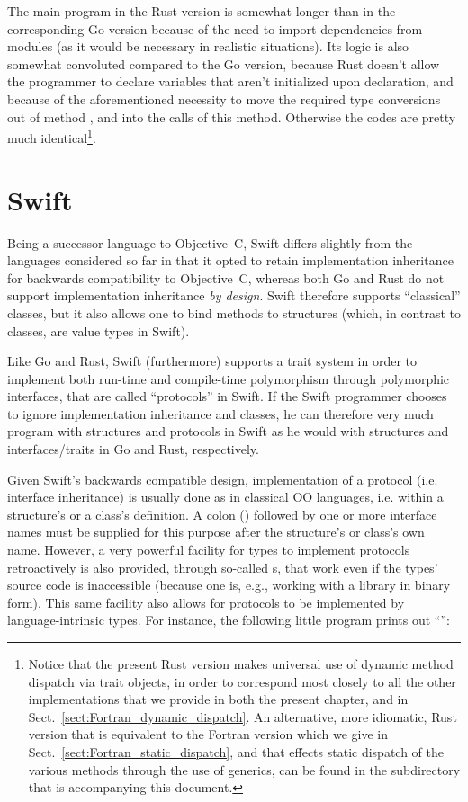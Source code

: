 \documentclass[11pt,oneside]{report}
\newcommand{\code}[1]{{\selectfont\ttfamily{#1}}}
\begin{document}
The main program in the Rust version is somewhat longer than in the
corresponding Go version because of the need to import dependencies
from modules (as it would be necessary in realistic situations). Its
logic is also somewhat convoluted compared to the Go version, because
Rust doesn't allow the programmer to declare variables that aren't
initialized upon declaration, and because of the aforementioned
necessity to move the required type conversions out of method
\code{average}, and into the calls of this method. Otherwise the codes
are pretty much identical\footnote{Notice that the present Rust
version makes universal use of dynamic method dispatch via trait
objects, in order to correspond most closely to all the other
implementations that we provide in both the present chapter, and in
Sect.~\ref{sect:Fortran_dynamic_dispatch}. An alternative, more
idiomatic, Rust version that is equivalent to the Fortran version
which we give in Sect.~\ref{sect:Fortran_static_dispatch}, and that
effects static dispatch of the various \code{sum} methods through the
use of generics, can be found in the \code{Code} subdirectory that is
accompanying this document.}.


\section{Swift}

Being a successor language to Objective~C, Swift differs slightly from
the languages considered so far in that it opted to retain
implementation inheritance for backwards compatibility to Objective~C,
whereas both Go and Rust do not support implementation inheritance
\emph{by design}. Swift therefore supports ``classical'' classes, but
it also allows one to bind methods to structures (which, in contrast
to classes, are value types in Swift).

Like Go and Rust, Swift (furthermore) supports a trait system in order
to implement both run-time and compile-time polymorphism through
polymorphic interfaces, that are called ``protocols'' in Swift. If the
Swift programmer chooses to ignore implementation inheritance and
classes, he can therefore very much program with structures and
protocols in Swift as he would with structures and interfaces/traits
in Go and Rust, respectively.

Given Swift's backwards compatible design, implementation of a
protocol (i.e. interface inheritance) is usually done as in
classical OO languages, i.e. within a structure's or a class's
definition. A colon (\code{:}) followed by one or more interface names
must be supplied for this purpose after the structure's or class's own
name. However, a very powerful facility for types to implement
protocols retroactively is also provided, through so-called
\code{extension}s, that work even if the types' source code is
inaccessible (because one is, e.g., working with a library in binary
form). This same facility also allows for protocols to be implemented
by language-intrinsic types. For instance, the following little
program prints out ``\code{I am 4.9}'':

\end{document}
